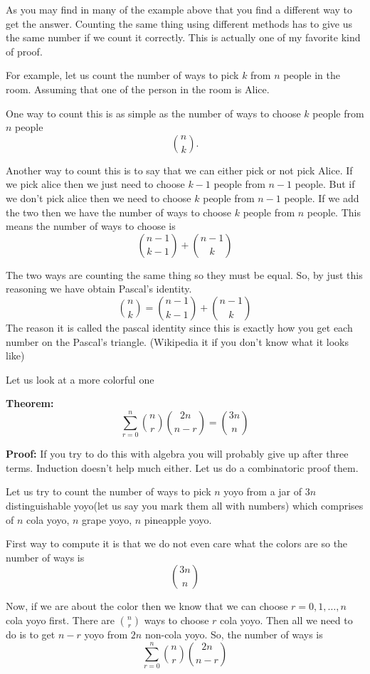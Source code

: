 \documentclass[a4paper, 12pt]{article}
\newcommand{\theorem}{\vspace{1em}\noindent\textbf{Theorem:} }
\renewcommand{\proof}{\vspace{0.5em}\noindent\textbf{Proof:} }
\begin{document}
\begin{multicols}{2}
	As you may find in many of the example above that you find a different way to get the answer. Counting the same thing using different methods has to give us the same number if we count it correctly. This is actually one of my favorite kind of proof.
	
	For example, let us count the number of ways to pick $k$ from $n$ people in the room. Assuming that one of the person in the room is Alice.
	
	One way to count this is as simple as the number of ways to choose $k$ people from $n$ people\[
	{n \choose k}.
	\]
	
	Another way to count this is to say that we can either pick or not pick Alice. If we pick alice then we just need to choose $k-1$ people from $n-1$ people. But if we don't pick alice then we need to choose $k$ people from $n-1$ people. If we add the two then we have the number of ways to choose $k$ people from $n$ people. This means the number of ways to choose  is
	\[
		{n-1\choose k-1} + {n-1 \choose k}
	\]
	
	The two ways are counting the same thing so they must be equal. So, by just this reasoning we have obtain Pascal's identity.
	\[
		{n \choose k} = {n-1\choose k-1} + {n-1 \choose k}
	\]
	The reason it is called the pascal identity since this is exactly how you get each number on the Pascal's triangle. (Wikipedia it if you don't know what it looks like)
	
	
	Let us look at a more colorful one
	
	\theorem\[
		\sum_{r=0}^{n} {n \choose r} {2n \choose n-r} = {3n \choose n}
	\]
	
	\proof If you try to do this with algebra you will probably give up after three terms. Induction doesn't help much either. Let us do a combinatoric proof them.
	
	Let us try to count the number of ways to pick $n$ yoyo from a jar of $3n$ distinguishable yoyo(let us say you mark them all with numbers) which comprises of $n$ cola yoyo, $n$ grape yoyo, $n$ pineapple yoyo.
	
	First way to compute it is that we do not even care what the colors are so the number of ways is
	\[
		{3n \choose n}
	\] 
	
	Now, if we are about the color then we know that we can choose $r = 0,1,\ldots,n$ cola yoyo first. There are $\displaystyle {n \choose r}$ ways to choose $r$ cola yoyo. Then all we need to do is to get $n-r$ yoyo from $2n$ non-cola yoyo. So, the number of ways is
	\[
		\sum_{r=0}^{n} {n \choose r} {2n \choose n-r}
	\]
	

\end{multicols}
\end{document}
